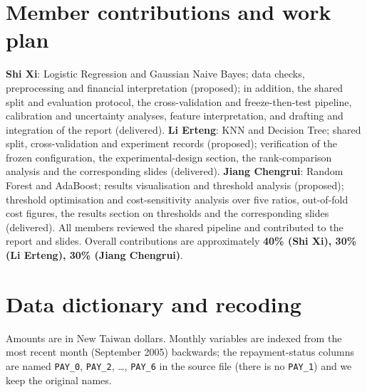 \documentclass{article}
\begin{document}
\section*{Member contributions and work plan}
\textbf{Shi Xi}: Logistic Regression and Gaussian Naive Bayes; data checks, preprocessing and financial interpretation (proposed); in addition, the shared split and evaluation protocol, the cross-validation and freeze-then-test pipeline, calibration and uncertainty analyses, feature interpretation, and drafting and integration of the report (delivered). \textbf{Li Erteng}: KNN and Decision Tree; shared split, cross-validation and experiment records (proposed); verification of the frozen configuration, the experimental-design section, the rank-comparison analysis and the corresponding slides (delivered). \textbf{Jiang Chengrui}: Random Forest and AdaBoost; results visualisation and threshold analysis (proposed); threshold optimisation and cost-sensitivity analysis over five ratios, out-of-fold cost figures, the results section on thresholds and the corresponding slides (delivered). All members reviewed the shared pipeline and contributed to the report and slides. Overall contributions are approximately \textbf{40\% (Shi Xi), 30\% (Li Erteng), 30\% (Jiang Chengrui)}.




\clearpage
\appendix
\section{Data dictionary and recoding}
\label{app:data}
Amounts are in New Taiwan dollars. Monthly variables are indexed from the most recent month (September 2005) backwards; the repayment-status columns are named \texttt{PAY\_0}, \texttt{PAY\_2}, \ldots, \texttt{PAY\_6} in the source file (there is no \texttt{PAY\_1}) and we keep the original names.
\end{document}
